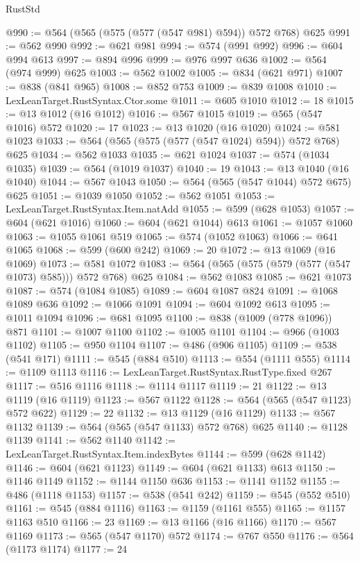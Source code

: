 \begin{lexlean}{RustStd}
\begin{coremodule}
{\begin{coremodule}
{{{{{{{{{{{{{@990 := @564 (@565 (@575 (@577 (@547 @981) @594)) @572 @768) @625
@991 := @562 @990
@992 := @621 @981
@994 := @574 (@991 @992)
@996 := @604 @994 @613
@997 := @894 @996
@999 := @976 @997 @636
@1002 := @564 (@974 @999) @625
@1003 := @562 @1002
@1005 := @834 (@621 @971)
@1007 := @838 (@841 @965)
@1008 := @852 @753
@1009 := @839 @1008
@1010 := LexLeanTarget.RustSyntax.Ctor.some
@1011 := @605 @1010
@1012 := 18
@1015 := @13 @1012 (@16 @1012)
@1016 := @567 @1015
@1019 := @565 (@547 @1016) @572
@1020 := 17
@1023 := @13 @1020 (@16 @1020)
@1024 := @581 @1023
@1033 := @564 (@565 (@575 (@577 (@547 @1024) @594)) @572 @768) @625
@1034 := @562 @1033
@1035 := @621 @1024
@1037 := @574 (@1034 @1035)
@1039 := @564 (@1019 @1037)
@1040 := 19
@1043 := @13 @1040 (@16 @1040)
@1044 := @567 @1043
@1050 := @564 (@565 (@547 @1044) @572 @675) @625
@1051 := @1039 @1050
@1052 := @562 @1051
@1053 := LexLeanTarget.RustSyntax.Item.natAdd
@1055 := @599 (@628 @1053)
@1057 := @604 (@621 @1016)
@1060 := @604 (@621 @1044) @613
@1061 := @1057 @1060
@1063 := @1055 @1061 @519
@1065 := @574 (@1052 @1063)
@1066 := @641 @1065
@1068 := @599 (@600 @242)
@1069 := 20
@1072 := @13 @1069 (@16 @1069)
@1073 := @581 @1072
@1083 := @564 (@565 (@575 (@579 (@577 (@547 @1073) @585))) @572 @768) @625
@1084 := @562 @1083
@1085 := @621 @1073
@1087 := @574 (@1084 @1085)
@1089 := @604 @1087 @824
@1091 := @1068 @1089 @636
@1092 := @1066 @1091
@1094 := @604 @1092 @613
@1095 := @1011 @1094
@1096 := @681 @1095
@1100 := @838 (@1009 (@778 @1096)) @871
@1101 := @1007 @1100
@1102 := @1005 @1101
@1104 := @966 (@1003 @1102)
@1105 := @950 @1104
@1107 := @486 (@906 @1105)
@1109 := @538 (@541 @171)
@1111 := @545 (@884 @510)
@1113 := @554 (@1111 @555)
@1114 := @1109 @1113
@1116 := LexLeanTarget.RustSyntax.RustType.fixed @267
@1117 := @516 @1116
@1118 := @1114 @1117
@1119 := 21
@1122 := @13 @1119 (@16 @1119)
@1123 := @567 @1122
@1128 := @564 (@565 (@547 @1123) @572 @622)
@1129 := 22
@1132 := @13 @1129 (@16 @1129)
@1133 := @567 @1132
@1139 := @564 (@565 (@547 @1133) @572 @768) @625
@1140 := @1128 @1139
@1141 := @562 @1140
@1142 := LexLeanTarget.RustSyntax.Item.indexBytes
@1144 := @599 (@628 @1142)
@1146 := @604 (@621 @1123)
@1149 := @604 (@621 @1133) @613
@1150 := @1146 @1149
@1152 := @1144 @1150 @636
@1153 := @1141 @1152
@1155 := @486 (@1118 @1153)
@1157 := @538 (@541 @242)
@1159 := @545 (@552 @510)
@1161 := @545 (@884 @1116)
@1163 := @1159 (@1161 @555)
@1165 := @1157 @1163 @510
@1166 := 23
@1169 := @13 @1166 (@16 @1166)
@1170 := @567 @1169
@1173 := @565 (@547 @1170) @572
@1174 := @767 @550
@1176 := @564 (@1173 @1174)
@1177 := 24
}}}}}}}}}}}}}
\end{coremodule}}
\end{coremodule}
\end{lexlean}
